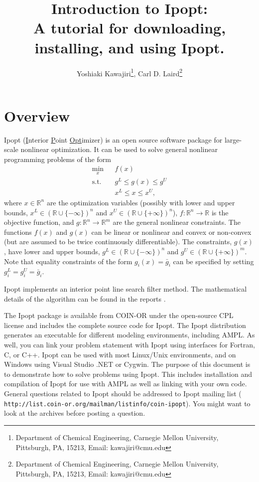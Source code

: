 \documentclass[letter,10pt]{article}
\newcommand{\RR}{{\mathbb{R}}}
\begin{document}
\title{Introduction to Ipopt:\\
A tutorial for downloading, installing, and using Ipopt.}

\author{Yoshiaki
Kawajiri\footnote{Department of Chemical Engineering, Carnegie Mellon
University, Pittsburgh, PA, 15213, Email: kawajiri@cmu.edu}, Carl
D. Laird\footnote{Department of Chemical Engineering, Carnegie Mellon
University, Pittsburgh, PA, 15213, Email: kawajiri@cmu.edu}}

\maketitle

\section{Overview}
Ipopt (\underline{I}nterior \underline{P}oint \underline{Opt}imizer) is an open
source software package for large-scale nonlinear optimization. It can
be used to solve general nonlinear programming problems of the form
\begin{eqnarray}
\min_{x} &&f(x) \label{obj} \\
\mbox{s.t.} \;  &&g^L \leq g(x) \leq g^U \\
                &&x^L \leq x \leq x^U, \label{bounds}
\end{eqnarray}
where $x \in \RR^n$ are the optimization variables (possibly with
lower and upper bounds, $x^L\in(\RR\cup\{-\infty\})^n$ and
$x^U\in(\RR\cup\{+\infty\})^n$), $f:\RR^n\longrightarrow\RR$ is the
objective function, and $g:\RR^n\longrightarrow \RR^m$ are the general
nonlinear constraints.  The functions $f(x)$ and $g(x)$ can be linear
or nonlinear and convex or non-convex (but are assumed to be twice
continuously differentiable). The constraints, $g(x)$, have lower and
upper bounds, $g^L\in(\RR\cup\{-\infty\})^n$ and
$g^U\in(\RR\cup\{+\infty\})^m$. Note that equality constraints of the
form $g_i(x)=\bar g_i$ can be specified by setting $g^L_{i}=g^U_{i}=\bar g_i$.

Ipopt implements an interior point line search filter method. The
mathematical details of the algorithm can be found in the reports
\cite{AndreasPaper} \cite{AndreasThesis}.

The Ipopt package is available from COIN-OR\cite{COINORWeb} under the
open-source CPL license and includes the complete source code for
Ipopt. The Ipopt distribution generates an executable for different
modeling environments, including AMPL. As well, you can link your
problem statement with Ipopt using interfaces for Fortran, C, or
C++. Ipopt can be used with most Linux/Unix environments, and on
Windows using Visual Studio .NET or Cygwin.  The purpose of this
document is to demonstrate how to solve problems using Ipopt. This
includes installation and compilation of Ipopt for use with AMPL as
well as linking with your own code. General questions related to Ipopt
should be addressed to Ipopt mailing list ({\tt
http://list.coin-or.org/mailman/listinfo/coin-ipopt}). You might want
to look at the archives before posting a question.
\end{document}
